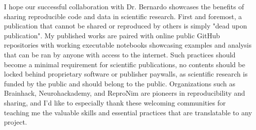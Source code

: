 I hope our successful collaboration with Dr. Bernardo showcases the benefits of sharing reproducible code and data in scientific research. First and foremost, a publication that cannot be shared or reproduced by others is simply "dead upon publication". My published works are paired with online public GitHub repositories with working executable notebooks showcasing examples and analysis that can be ran by anyone with access to the internet. Such practices should become a minimal requirement for scientific publications, no contents should be locked behind proprietary software or publisher paywalls, as scientific research is funded by the public and should belong to the public. Organizations such as Brainhack, Neurohackademy, and ReproNim are pioneers in reproducibility and sharing, and I'd like to especially thank these welcoming communities for teaching me the valuable skills and essential practices that are translatable to any project.


